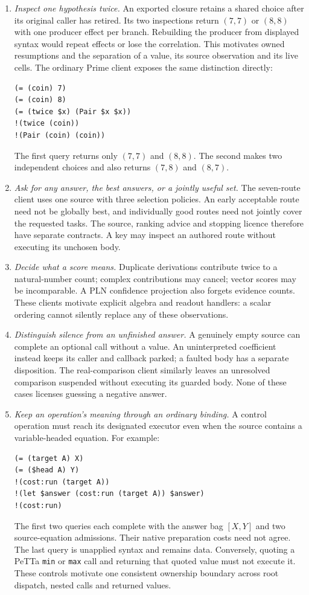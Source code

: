 \documentclass[11pt]{article}
\theoremstyle{definition}
\theoremstyle{remark}
\begin{document}
\begin{enumerate}
\item \emph{Inspect one hypothesis twice.}
An exported closure retains a shared choice after its original caller has
retired. Its two inspections return $(7,7)$ or $(8,8)$ with one producer
effect per branch. Rebuilding the producer from displayed syntax would
repeat effects or lose the correlation. This motivates owned resumptions
and the separation of a value, its source observation and its live cells.
The ordinary Prime client exposes the same distinction directly:
\begin{verbatim}
(= (coin) 7)
(= (coin) 8)
(= (twice $x) (Pair $x $x))
!(twice (coin))
!(Pair (coin) (coin))
\end{verbatim}
The first query returns only $(7,7)$ and $(8,8)$. The second makes two
independent choices and also returns $(7,8)$ and $(8,7)$.

\item \emph{Ask for any answer, the best answers, or a jointly useful set.}
The seven-route client uses one source with three selection policies.
An early acceptable route need not be globally best, and individually
good routes need not jointly cover the requested tasks. The source,
ranking advice and stopping licence therefore have separate contracts.
A key may inspect an authored route without executing its unchosen body.

\item \emph{Decide what a score means.}
Duplicate derivations contribute twice to a natural-number count; complex
contributions may cancel; vector scores may be incomparable. A PLN
confidence projection also forgets evidence counts. These clients motivate
explicit algebra and readout handlers: a scalar ordering cannot silently
replace any of these observations.

\item \emph{Distinguish silence from an unfinished answer.}
A genuinely empty source can complete an optional call without a value.
An uninterpreted coefficient instead keeps its caller and callback parked;
a faulted body has a separate disposition. The real-comparison client
similarly leaves an unresolved comparison suspended without executing its
guarded body. None of these cases licenses guessing a negative answer.

\item \emph{Keep an operation's meaning through an ordinary binding.}
A control operation must reach its designated executor even when the source
contains a variable-headed equation. For example:
\begin{verbatim}
(= (target A) X)
(= ($head A) Y)
!(cost:run (target A))
!(let $answer (cost:run (target A)) $answer)
!(cost:run)
\end{verbatim}
The first two queries each complete with the answer bag $[X,Y]$ and two
source-equation admissions. Their native preparation costs need not agree.
The last query is unapplied syntax and remains data. Conversely, quoting a
PeTTa \nolinkurl{min} or \nolinkurl{max} call and returning that quoted value
must not execute it. These controls motivate one consistent ownership
boundary across root dispatch, nested calls and returned values.


\end{enumerate}
\end{document}
